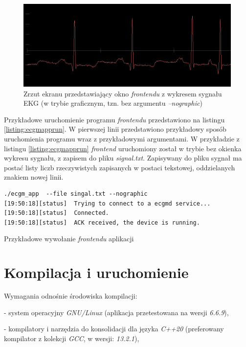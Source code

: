 \begin{figure}[h!]
    \centering 
    \includegraphics[scale=0.45]{pl/media/frontend_window.png}
    \caption{Zrzut ekranu przedstawiający okno \textit{frontendu} z wykresem sygnału EKG 
    (w trybie graficznym, tzn. bez argumentu \textit{--nographic})}
    \label{fig:frontendwin}
\end{figure}

Przykładowe uruchomienie programu \textit{frontendu} przedstawiono na listingu \ref{listing:ecgmapprun}.
W pierwszej linii przedstawiono przykładowy sposób uruchomienia programu wraz z przykładowymi argumentami.
W przykładzie z listingu \ref{listing:ecgmapprun} \textit{frontend} uruchomiony został w trybie bez
okienka wykresu sygnału, z zapisem do pliku \textit{signal.txt}. Zapisywany do pliku sygnał ma
postać listy liczb rzeczywistych zapisanych w postaci tekstowej, oddzielanych znakiem nowej linii.

\begin{listing}
\begin{verbatim}
./ecgm_app  --file singal.txt --nographic 
[19:50:18][status] 	Trying to connect to a ecgmd service...
[19:50:18][status] 	Connected.
[19:50:18][status] 	ACK received, the device is running.
\end{verbatim}
    \caption{Przykładowe wywołanie \textit{frontendu} aplikacji}
\label{listing:ecgmapprun}
\end{listing}

\newpage

\section{Kompilacja i uruchomienie}

Wymagania odnośnie środowiska kompilacji:

- system operacyjny \textit{GNU/Linux} (aplikacja przetestowana na wersji \textit{6.6.9}),

- kompilatory i narzędzia do konsolidacji dla języka \textit{C++20}
  (preferowany kompilator z kolekcji \textit{GCC}, w wersji: \textit{13.2.1}),

